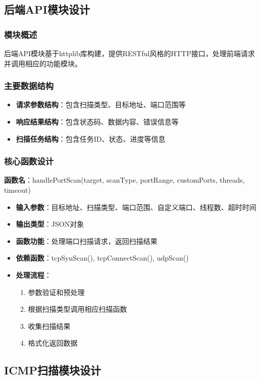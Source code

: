 \documentclass[12pt,hyperref,a4paper,UTF8]{ctexart}
\begin{document}
\subsection{后端API模块设计}

\subsubsection{模块概述}
后端API模块基于httplib库构建，提供RESTful风格的HTTP接口，处理前端请求并调用相应的功能模块。

\subsubsection{主要数据结构}
\begin{itemize}
    \item \textbf{请求参数结构}：包含扫描类型、目标地址、端口范围等
    \item \textbf{响应结果结构}：包含状态码、数据内容、错误信息等
    \item \textbf{扫描任务结构}：包含任务ID、状态、进度等信息
\end{itemize}

\subsubsection{核心函数设计}

\textbf{函数名}：handlePortScan(target, scanType, portRange, customPorts, threads, timeout)
\begin{itemize}
    \item \textbf{输入参数}：目标地址、扫描类型、端口范围、自定义端口、线程数、超时时间
    \item \textbf{输出类型}：JSON对象
    \item \textbf{函数功能}：处理端口扫描请求，返回扫描结果
    \item \textbf{依赖函数}：tcpSynScan(), tcpConnectScan(), udpScan()
    \item \textbf{处理流程}：
    \begin{enumerate}
        \item 参数验证和预处理
        \item 根据扫描类型调用相应扫描函数
        \item 收集扫描结果
        \item 格式化返回数据
    \end{enumerate}
\end{itemize}

\subsection{ICMP扫描模块设计}
\end{document}
